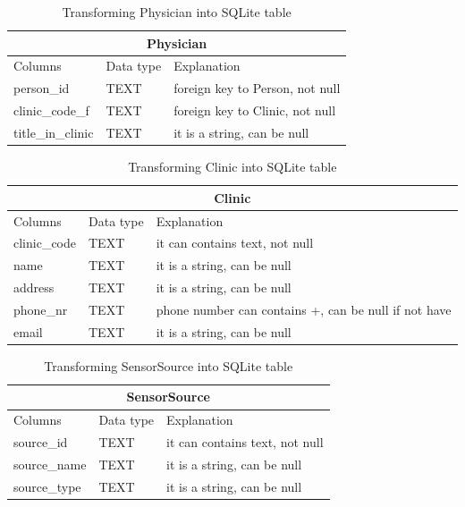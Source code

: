 \begin{table}
\begin{center}
\begin{tabular}{ |p{4cm}|p{1.8cm}|p{6.2cm}|  }
 \hline
 \multicolumn{3}{|c|}{Physician} \\
 \hline
 Columns& Data type & Explanation \\
 \hline
 person\_id& TEXT& foreign key to Person, not null\\
 clinic\_code\_f& TEXT& foreign key to Clinic, not null\\
 title\_in\_clinic& TEXT& it is a string, can be null\\
 \hline
\end{tabular}
\end{center}
\caption{Transforming Physician into SQLite table}
\label{tab:PhysicianTypeSQL}
\end{table}
\begin{table}
\begin{center}
\begin{tabular}{ |p{4cm}|p{1.8cm}|p{6.2cm}|  }
 \hline
 \multicolumn{3}{|c|}{Clinic} \\
 \hline
 Columns& Data type & Explanation \\
 \hline
 clinic\_code& TEXT& it can contains text, not null\\
 name& TEXT& it is a string, can be null\\
 address& TEXT& it is a string, can be null\\
 phone\_nr& TEXT& phone number can contains +, can be null if not have\\
 email& TEXT& it is a string, can be null\\
 \hline
\end{tabular}
\end{center}
\caption{Transforming Clinic into SQLite table}
\label{tab:ClinicTypeSQL}
\end{table}
\begin{table}
\begin{center}
\begin{tabular}{ |p{4cm}|p{1.8cm}|p{6.2cm}|  }
 \hline
 \multicolumn{3}{|c|}{SensorSource} \\
 \hline
 Columns& Data type & Explanation \\
 \hline
 source\_id& TEXT& it can contains text, not null\\
 source\_name& TEXT& it is a string, can be null\\
 source\_type& TEXT& it is a string, can be null\\
 \hline
\end{tabular}
\end{center}
\caption{Transforming SensorSource into SQLite table}
\label{tab:SensorSourceTypeSQL}
\end{table}
